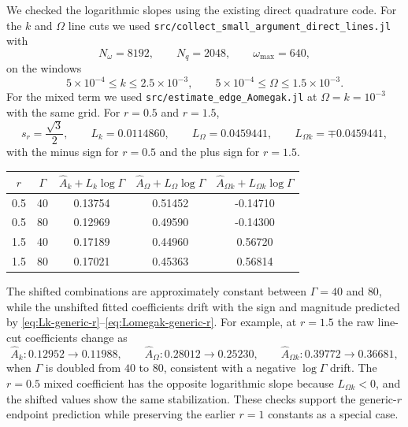 \documentclass[aps,prx,preprint,amsmath,amssymb]{revtex4-2}
\begin{document}
We checked the logarithmic slopes using the existing direct quadrature code.
For the \(k\) and \(\Omega\) line cuts we used
\texttt{src/collect\_small\_argument\_direct\_lines.jl} with
\[
N_\omega=8192,\qquad N_q=2048,\qquad \omega_{\max}=640,
\]
on the windows
\[
5\times10^{-4}\le k\le 2.5\times10^{-3},
\qquad
5\times10^{-4}\le \Omega\le 1.5\times10^{-3}.
\]
For the mixed term we used
\texttt{src/estimate\_edge\_Aomegak.jl} at
\(\Omega=k=10^{-3}\) with the same grid.  For \(r=0.5\) and \(r=1.5\),
\[
s_r=\frac{\sqrt3}{2},
\qquad
L_k=0.0114860,
\qquad
L_\Omega=0.0459441,
\qquad
L_{\Omega k}=\mp 0.0459441,
\]
with the minus sign for \(r=0.5\) and the plus sign for \(r=1.5\).

\begin{center}
\begin{tabular}{ccccc}
\toprule
\(r\) & \(\Gamma\) &
\(\widehat A_k+L_k\log\Gamma\) &
\(\widehat A_\Omega+L_\Omega\log\Gamma\) &
\(\widehat A_{\Omega k}+L_{\Omega k}\log\Gamma\) \\
\midrule
0.5 & 40 & 0.13754 & 0.51452 & -0.14710 \\
0.5 & 80 & 0.12969 & 0.49590 & -0.14300 \\
1.5 & 40 & 0.17189 & 0.44960 & 0.56720 \\
1.5 & 80 & 0.17021 & 0.45363 & 0.56814 \\
\bottomrule
\end{tabular}
\end{center}

The shifted combinations are approximately constant between
\(\Gamma=40\) and \(80\), while the unshifted fitted coefficients drift with the
sign and magnitude predicted by \eqref{eq:Lk-generic-r}--\eqref{eq:Lomegak-generic-r}.
For example, at \(r=1.5\) the raw line-cut coefficients change as
\[
\widehat A_k: 0.12952\to0.11988,
\qquad
\widehat A_\Omega: 0.28012\to0.25230,
\qquad
\widehat A_{\Omega k}: 0.39772\to0.36681,
\]
when \(\Gamma\) is doubled from \(40\) to \(80\), consistent with a negative
\(\log\Gamma\) drift.  The \(r=0.5\) mixed coefficient has the opposite
logarithmic slope because \(L_{\Omega k}<0\), and the shifted values show the
same stabilization.  These checks support the generic-\(r\) endpoint prediction
while preserving the earlier \(r=1\) constants as a special case.
\end{document}

